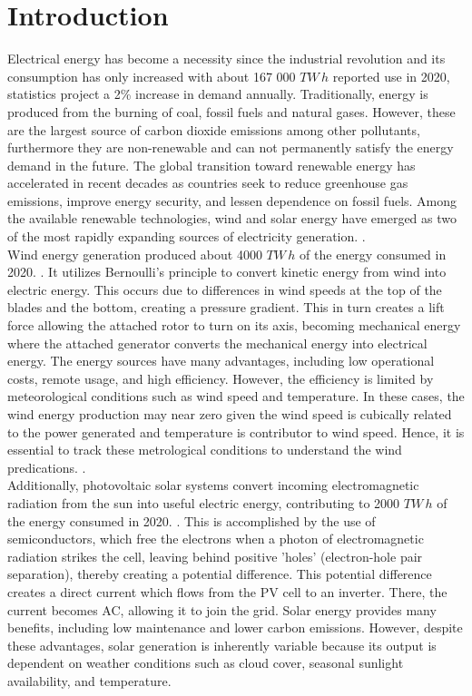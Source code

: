 \documentclass[conference]{IEEEtran}
\begin{document}
\section{Introduction}
Electrical energy has become a necessity since the industrial revolution and its consumption has only increased with about 167 000 $TW\,h$ reported use in 2020, statistics project a 2\% increase in demand annually. Traditionally, energy is produced from the burning of coal, fossil fuels and natural gases. However, these are the largest source of carbon dioxide emissions among other pollutants, furthermore they are non-renewable and can not permanently satisfy the energy demand in the future. The global transition toward renewable energy has accelerated in recent decades as countries seek to reduce greenhouse gas emissions, improve energy security, and lessen dependence on fossil fuels. Among the available renewable technologies, wind and solar energy have emerged as two of the most rapidly expanding sources of electricity generation. \cite{owid_energy}.
\\ Wind energy generation produced about 4000 $TW\,h$ of the energy consumed in 2020. \cite{owid_energy}. It utilizes Bernoulli's principle to convert kinetic energy from wind into electric energy. This occurs due to differences in wind speeds at the top of the blades and the bottom, creating a pressure gradient. This in turn creates a lift force allowing the attached rotor to turn on its axis, becoming mechanical energy where the attached generator converts the mechanical energy into electrical energy. The energy sources have many advantages, including low operational costs, remote usage, and high efficiency. However, the efficiency is limited by meteorological conditions such as wind speed and temperature. In these cases, the wind energy production may near zero given the wind speed is cubically related to the power generated and temperature is contributor to wind speed. Hence, it is essential to track these metrological conditions to understand the wind predications. \cite{hu_wind_energy,twidell_weir}.
\\ Additionally, photovoltaic solar systems convert incoming electromagnetic radiation from the sun into useful electric energy, contributing to 2000 $TW\,h$ of the energy consumed in 2020. \cite{owid_energy}. This is accomplished by the use of semiconductors, which free the electrons when a photon of electromagnetic radiation strikes the cell, leaving behind positive 'holes' (electron-hole pair separation), thereby creating a potential difference. This potential difference creates a direct current which flows from the PV cell to an inverter. There, the current becomes AC, allowing it to join the grid. Solar energy provides many benefits, including low maintenance and lower carbon emissions. However, despite these advantages, solar generation is inherently variable because its output is dependent on weather conditions such as cloud cover, seasonal sunlight availability, and temperature.\cite{usdoe_solar,twidell_weir}
\end{document}
